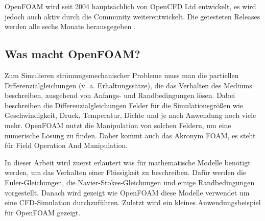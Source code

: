 OpenFOAM wird seit 2004 hauptsächlich von OpenCFD Ltd entwickelt, es wird jedoch auch aktiv durch die Community weiterentwickelt.
%
Die getesteten Releases werden alle sechs Monate herausgegeben \cite{openfoam:greenshieldsweller2022}.

\subsection{Was macht OpenFOAM?}
Zum Simulieren strömungsmechanischer Probleme muss man die partiellen Differenzialgleichungen (v. a. Erhaltungssätze), die das Verhalten des Mediums beschreiben, ausgehend von Anfangs- und Randbedingungen lösen.
%
%
Dabei beschreiben die Differenzialgleichungen Felder für die Simulationsgrößen wie Geschwindigkeit, Druck, Temperatur, Dichte und je nach Anwendung noch viele mehr. OpenFOAM nutzt die Manipulation von solchen Feldern, um eine numerische Lösung zu finden. Daher kommt auch das Akronym FOAM, es steht für Field Operation And Manipulation.
%
%
%
%
%

In dieser Arbeit wird zuerst erläutert was für mathematische Modelle benötigt werden, um das Verhalten einer Flüssigkeit zu beschreiben.
%
%
%
Dafür werden die Euler-Gleichungen, die Navier-Stokes-Gleichungen und einige Randbedingungen vorgestellt.
Danach wird gezeigt wie OpenFOAM diese Modelle verwendet um eine CFD-Simulation durchzuführen.
Zuletzt wird ein kleines Anwendungsbeispiel für OpenFOAM gezeigt.
